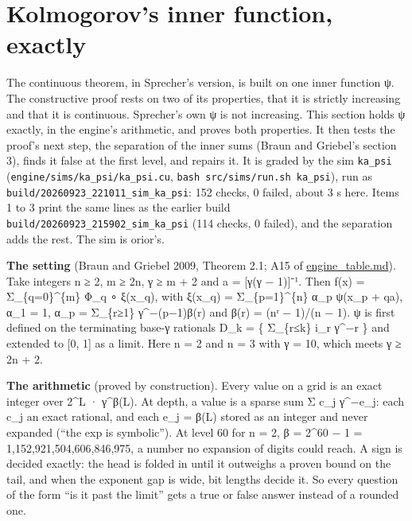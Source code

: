 \section{\texorpdfstring{Kolmogorov's inner function, exactly}{Kolmogorov's inner function, exactly}}

The continuous theorem, in Sprecher's version, is built on one inner function ψ. The constructive proof rests on two of its properties, that it is strictly increasing and that it is continuous. Sprecher's own ψ is not increasing. This section holds ψ exactly, in the engine's arithmetic, and proves both properties. It then tests the proof's next step, the separation of the inner sums (Braun and Griebel's section 3), finds it false at the first level, and repairs it. It is graded by the sim \texttt{ka\_\allowbreak{}psi} (\texttt{engine/\allowbreak{}sims/\allowbreak{}ka\_\allowbreak{}psi/\allowbreak{}ka\_\allowbreak{}psi.\allowbreak{}cu}, \texttt{bash src/\allowbreak{}sims/\allowbreak{}run.\allowbreak{}sh ka\_\allowbreak{}psi}), run as \texttt{build/\allowbreak{}20260923\_\allowbreak{}221011\_\allowbreak{}sim\_\allowbreak{}ka\_\allowbreak{}psi}: 152 checks, 0 failed, about 3 s here. Items 1 to 3 print the same lines as the earlier build \texttt{build/\allowbreak{}20260923\_\allowbreak{}215902\_\allowbreak{}sim\_\allowbreak{}ka\_\allowbreak{}psi} (114 checks, 0 failed), and the separation adds the rest. The sim is orior's.

\textbf{The setting} (Braun and Griebel 2009, Theorem 2.1; A15 of \hyperref[chap:engine-table]{engine\_\allowbreak{}table.md}). Take integers n ≥ 2, m ≥ 2n, γ ≥ m + 2 and a = [γ(γ − 1)]⁻¹. Then f(x) = Σ\_\allowbreak{}\{q=0\}\textasciicircum{}\{m\} Φ\_\allowbreak{}q ∘ ξ(x\_\allowbreak{}q), with ξ(x\_\allowbreak{}q) = Σ\_\allowbreak{}\{p=1\}\textasciicircum{}\{n\} α\_\allowbreak{}p ψ(x\_\allowbreak{}p + qa), α\_\allowbreak{}1 = 1, α\_\allowbreak{}p = Σ\_\allowbreak{}\{r≥1\} γ\textasciicircum{}−(p−1)β(r) and β(r) = (nʳ − 1)/(n − 1). ψ is first defined on the terminating base-γ rationals D\_\allowbreak{}k = \{ Σ\_\allowbreak{}\{r≤k\} i\_\allowbreak{}r γ\textasciicircum{}−r \} and extended to [0, 1] as a limit. Here n = 2 and n = 3 with γ = 10, which meets γ ≥ 2n + 2.

\textbf{The arithmetic} (proved by construction). Every value on a grid is an exact integer over 2\textasciicircum{}L · γ\textasciicircum{}β(L). At depth, a value is a sparse sum Σ c\_\allowbreak{}j γ\textasciicircum{}−e\_\allowbreak{}j: each c\_\allowbreak{}j an exact rational, and each e\_\allowbreak{}j = β(L) stored as an integer and never expanded (“the exp is symbolic”). At level 60 for n = 2, β = 2\textasciicircum{}60 − 1 = 1,152,921,504,606,846,975, a number no expansion of digits could reach. A sign is decided exactly: the head is folded in until it outweighs a proven bound on the tail, and when the exponent gap is wide, bit lengths decide it. So every question of the form “is it past the limit” gets a true or false answer instead of a rounded one.

